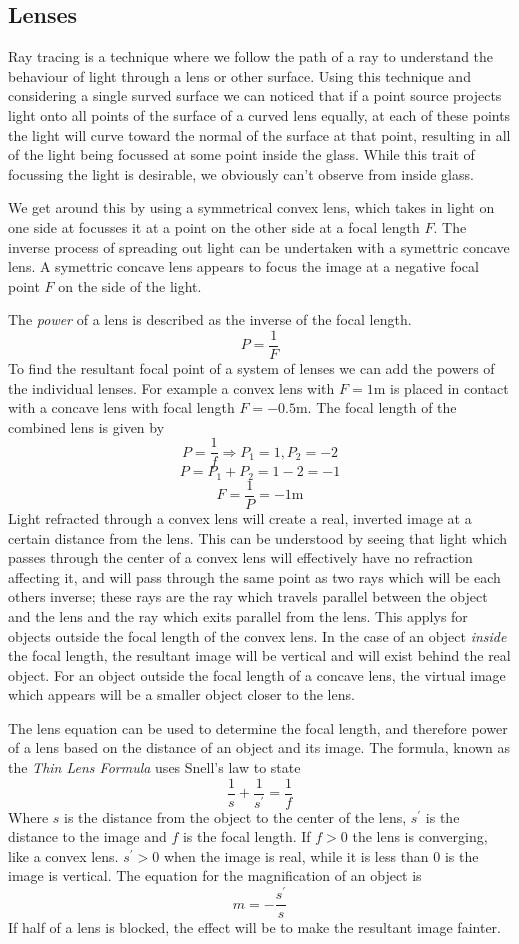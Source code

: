 \documentclass[12pt]{report}
\begin{document}
\begin{flushleft}
\subsection*{Lenses}
Ray tracing is a technique where we follow the path of a ray to understand the
behaviour of light through a lens or other surface. Using this technique and
considering a single surved surface we can noticed that if a point source
projects light onto all points of the surface of a curved lens equally, at each
of these points the light will curve toward the normal of the surface at that
point, resulting in all of the light being focussed at some point inside the
glass. While this trait of focussing the light is desirable, we obviously can't
observe from inside glass.

\bigskip
We get around this by using a symmetrical convex lens, which takes in light on
one side at focusses it at a point on the other side at a focal length \(F\).
The inverse process of spreading out light can be undertaken with a symettric
concave lens. A symettric concave lens appears to focus the image at a negative
focal point \(F\) on the side of the light.

\bigskip
The \textit{power} of a lens is described as the inverse of the focal length.
\[P = \frac{1}{F}\]
To find the resultant focal point of a system of lenses we can add the powers
of the individual lenses. For example a convex lens with \(F = 1\mathrm{m}\) is
placed in contact with a concave lens with focal length \(F = -0.5\mathrm{m}\).
The focal length of the combined lens is given by
\[P = \frac{1}{f} \Rightarrow P_1 = 1, P_2 = -2\]
\[P = P_1 + P_2 = 1 - 2 = -1\]
\[F = \frac{1}{P} = -1\mathrm{m}\]
Light refracted through a convex lens will create a real, inverted image at a
certain distance from the lens. This can be understood by seeing that light
which passes through the center of a convex lens will effectively have no
refraction affecting it, and will pass through the same point as two rays
which will be each others inverse; these rays are the ray which travels 
parallel between the object and the lens and the ray which exits parallel
from the lens. This applys for objects outside the focal length of the convex
lens. In the case of an object \textit{inside} the focal length, the resultant
image will be vertical and will exist behind the real object.
For an object outside the focal length of a concave lens, the virtual image
which appears will be a smaller object closer to the lens.

\bigskip
The lens equation can be used to determine the focal length, and therefore
power of a lens based on the distance of an object and its image. The formula,
known as the \textit{Thin Lens Formula} uses Snell's law to state
\[\frac{1}{s}+ \frac{1}{s^\prime} = \frac{1}{f}\]
Where \(s\) is the distance from the object to the center of the lens, 
\(s^\prime\) is the distance to the image and \(f\) is the focal length. If
\(f > 0\) the lens is converging, like a convex lens. \(s^\prime > 0\) when
the image is real, while it is less than \(0\) is the image is vertical. The
equation for the magnification of an object is
\[m = -\frac{s^\prime}{s}\]
If half of a lens is blocked, the effect will be to make the resultant image
fainter.


\end{flushleft}
\end{document}

